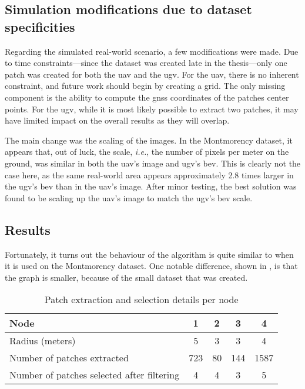 \subsection{Simulation modifications due to dataset specificities}

Regarding the simulated real-world scenario, a few modifications were made.
Due to time constraints---since the dataset was created late in the thesis---only one patch was created for both the \gls{uav} and the \gls{ugv}.
For the \gls{uav}, there is no inherent constraint, and future work should begin by creating a grid.
The only missing component is the ability to compute the \gls{gnss} coordinates of the patches center points.
For the \gls{ugv}, while it is most likely possible to extract two patches, it may have limited impact on the overall results
as they will overlap.

The main change was the scaling of the images.
In the Montmorency dataset, it appears that, out of luck, the scale, \textit{i.e.}, the number of pixels per meter on the ground,
was similar in both the \gls{uav}'s image and \gls{ugv}'s \gls{bev}.
This is clearly not the case here, as the same real-world area appears approximately 2.8 times larger in the
\gls{ugv}'s \gls{bev} than in the \gls{uav}'s image.
After minor testing, the best solution was found to be scaling up the \gls{uav}'s image to match the \gls{ugv}'s \gls{bev} scale.

\subsection{Results}

Fortunately, it turns out the behaviour of the algorithm is quite similar to when it is used on the Montmorency dataset.
One notable difference, shown in , is that the graph is smaller, because of the small dataset that was created.

\begin{table}[ht!]
    \centering
    \begin{tabular}{|l|c|c|c|c|}
        \hline
        Node                                       & 1   & 2  & 3   & 4    \\ \hline
        Radius (meters)                            & 5   & 3  & 3   & 4    \\ \hline
        Number of patches extracted                & 723 & 80 & 144 & 1587 \\ \hline
        Number of patches selected after filtering & 4   & 4  & 3   & 5    \\ \hline
    \end{tabular}
    \caption{Patch extraction and selection details per node}
    \label{tab:hub_drone:node_details}
\end{table}

